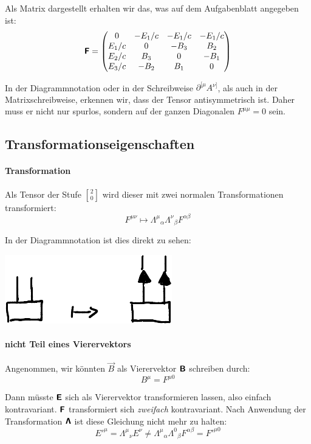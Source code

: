 Als Matrix dargestellt erhalten wir das, was auf dem Aufgabenblatt angegeben
ist:
\[
	\boldsymbol{\mathsf{F}}
	=
	\begin{pmatrix}
		0 & -E_1/c & -E_1/c & -E_1/c \\
		E_1/c & 0 & -B_3 & B_2 \\
		E_2/c & B_3 & 0 & -B_1 \\
		E_3/c & -B_2 & B_1 & 0 \\
	\end{pmatrix}
\]

In der Diagrammnotation oder in der Schreibweise $\partial^{[\mu} A^{\nu]}$, als
auch in der Matrixschreibweise, erkennen wir, dass der Tensor antisymmetrisch
ist. Daher muss er nicht nur spurlos, sondern auf der ganzen Diagonalen
$F^{\mu\mu} = 0$ sein.

\subsection{Transformationseigenschaften}

\paragraph{Transformation}

Als Tensor der Stufe ${2 \brack 0}$ wird dieser mit zwei normalen
Transformationen transformiert:
\[
	F^{\mu\nu} \mapsto \Lambda^\mu{}_\alpha \Lambda^\nu{}_\beta F^{\alpha\beta}
\]

In der Diagrammnotation ist dies direkt zu sehen:
\begin{center}
	\includegraphics{H1-Penrose-9-crop.pdf}
\end{center}

\paragraph{nicht Teil eines Vierervektors}

Angenommen, wir könnten $\vec B$ als Vierervektor $\boldsymbol{\mathsf{B}}$ schreiben durch:
\[
	B^\mu = F^{\mu0}
\]

Dann müsste $\boldsymbol{\mathsf{E}}$ sich als Vierervektor transformieren lassen, also einfach
kontravariant. $\boldsymbol{\mathsf{F}}$ transformiert sich \emph{zweifach} kontravariant. Nach
Anwendung der Transformation $\boldsymbol{\mathsf{\Lambda}}$ ist diese Gleichung nicht mehr zu
halten:
\[
	E'^\mu
	= \Lambda^\mu{}_\nu E^\nu
	\neq
	\Lambda^\mu{}_\alpha \Lambda^0{}_\beta F^{\alpha\beta}
	= F'^{\mu0}
\]


